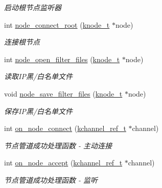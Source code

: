 \begin{DoxyCompactItemize}
\begin{DoxyCompactList}\small\item\em 启动根节点监听器 \end{DoxyCompactList}\item 
int \hyperlink{a00101_a9bae6e0e7f362d9dae9ee27d42ad0e78_a9bae6e0e7f362d9dae9ee27d42ad0e78}{node\+\_\+connect\+\_\+root} (\hyperlink{a00066_a5e720b27efbc9ad744240f5f4233763a_a5e720b27efbc9ad744240f5f4233763a}{knode\+\_\+t} $\ast$node)
\begin{DoxyCompactList}\small\item\em 连接根节点 \end{DoxyCompactList}\item 
int \hyperlink{a00101_af21be279fb6545838987e35d2022d8de_af21be279fb6545838987e35d2022d8de}{node\+\_\+open\+\_\+filter\+\_\+files} (\hyperlink{a00066_a5e720b27efbc9ad744240f5f4233763a_a5e720b27efbc9ad744240f5f4233763a}{knode\+\_\+t} $\ast$node)
\begin{DoxyCompactList}\small\item\em 读取\+I\+P黑/白名单文件 \end{DoxyCompactList}\item 
void \hyperlink{a00101_a54139242ade232ae556dc2781bf36c76_a54139242ade232ae556dc2781bf36c76}{node\+\_\+save\+\_\+filter\+\_\+files} (\hyperlink{a00066_a5e720b27efbc9ad744240f5f4233763a_a5e720b27efbc9ad744240f5f4233763a}{knode\+\_\+t} $\ast$node)
\begin{DoxyCompactList}\small\item\em 保存\+I\+P黑/白名单文件 \end{DoxyCompactList}\item 
int \hyperlink{a00101_a42e77e8c8913b99c23f3dab6b829b2ed_a42e77e8c8913b99c23f3dab6b829b2ed}{on\+\_\+node\+\_\+connect} (\hyperlink{a00066_a3b7e82599367eade261456f60ebe2cd9_a3b7e82599367eade261456f60ebe2cd9}{kchannel\+\_\+ref\+\_\+t} $\ast$channel)
\begin{DoxyCompactList}\small\item\em 节点管道成功处理函数 -\/ 主动连接 \end{DoxyCompactList}\item 
int \hyperlink{a00101_af2ac58191a40af414f62c9eccaeb4a5a_af2ac58191a40af414f62c9eccaeb4a5a}{on\+\_\+node\+\_\+accept} (\hyperlink{a00066_a3b7e82599367eade261456f60ebe2cd9_a3b7e82599367eade261456f60ebe2cd9}{kchannel\+\_\+ref\+\_\+t} $\ast$channel)
\begin{DoxyCompactList}\small\item\em 节点管道成功处理函数 -\/ 监听 \end{DoxyCompactList}\item 

\end{DoxyCompactItemize}
